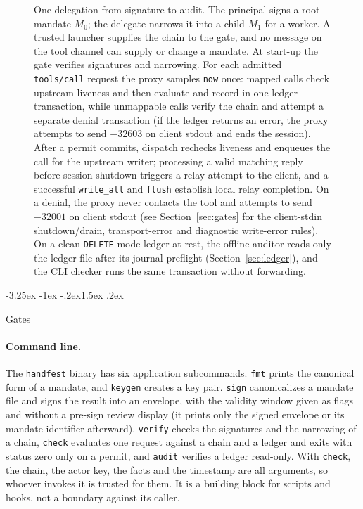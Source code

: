 \documentclass[10pt,twocolumn]{article}
\makeatletter
\theoremstyle{plain}
\theoremstyle{definition}
\renewcommand\subsection{\@startsection{subsection}{2}{\z@}%
  {-3.25ex \@plus -1ex \@minus -.2ex}{1.5ex \@plus .2ex}%
  {\normalfont\large\bfseries\raggedright}}
\makeatother
\begin{document}
\begin{figure}[p]
\caption{One delegation from signature to audit. The principal signs a root mandate $M_0$; the delegate narrows it into a child $M_1$ for a worker. A trusted launcher supplies the chain to the gate, and no message on the tool channel can supply or change a mandate. At start-up the gate verifies signatures and narrowing. For each admitted \texttt{tools/call} request the proxy samples \texttt{now} once: mapped calls check upstream liveness and then evaluate and record in one ledger transaction, while unmappable calls verify the chain and attempt a separate denial transaction (if the ledger returns an error, the proxy attempts to send $-32603$ on client stdout and ends the session). After a permit commits, dispatch rechecks liveness and enqueues the call for the upstream writer; processing a valid matching reply before session shutdown triggers a relay attempt to the client, and a successful \texttt{write\_all} and \texttt{flush} establish local relay completion. On a denial, the proxy never contacts the tool and attempts to send $-32001$ on client stdout (see Section~\ref{sec:gates} for the client-stdin shutdown/drain, transport-error and diagnostic write-error rules). On a clean \texttt{DELETE}-mode ledger at rest, the offline auditor reads only the ledger file after its journal preflight (Section~\ref{sec:ledger}), and the CLI checker runs the same transaction without forwarding.}
\label{fig:seq}
\end{figure}

\subsection{Gates}
\label{sec:gates}

\paragraph{Command line.}
The \texttt{handfest} binary has six application subcommands. \texttt{fmt} prints the canonical form of a mandate, and \texttt{keygen} creates a key pair. \texttt{sign} canonicalizes a mandate file and signs the result into an envelope, with the validity window given as flags and without a pre-sign review display (it prints only the signed envelope or its mandate identifier afterward). \texttt{verify} checks the signatures and the narrowing of a chain, \texttt{check} evaluates one request against a chain and a ledger and exits with status zero only on a permit, and \texttt{audit} verifies a ledger read-only. With \texttt{check}, the chain, the actor key, the facts and the timestamp are all arguments, so whoever invokes it is trusted for them. It is a building block for scripts and hooks, not a boundary against its caller.
\end{document}
